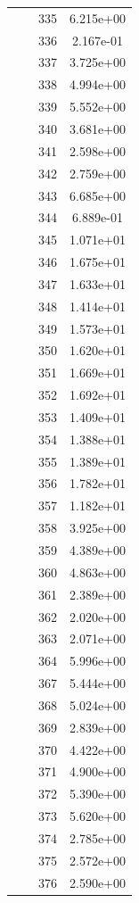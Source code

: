 \documentclass[12pt]{article}
\begin{document}
\begin{longtable}{@{}cccc@{}}
 &  & 335 & 6.215e+00 \\
 &  & 336 & 2.167e-01 \\
 &  & 337 & 3.725e+00 \\
 &  & 338 & 4.994e+00 \\
 &  & 339 & 5.552e+00 \\
 &  & 340 & 3.681e+00 \\
 &  & 341 & 2.598e+00 \\
 &  & 342 & 2.759e+00 \\
 &  & 343 & 6.685e+00 \\
 &  & 344 & 6.889e-01 \\
 &  & 345 & 1.071e+01 \\
 &  & 346 & 1.675e+01 \\
 &  & 347 & 1.633e+01 \\
 &  & 348 & 1.414e+01 \\
 &  & 349 & 1.573e+01 \\
 &  & 350 & 1.620e+01 \\
 &  & 351 & 1.669e+01 \\
 &  & 352 & 1.692e+01 \\
 &  & 353 & 1.409e+01 \\
 &  & 354 & 1.388e+01 \\
 &  & 355 & 1.389e+01 \\
 &  & 356 & 1.782e+01 \\
 &  & 357 & 1.182e+01 \\
 &  & 358 & 3.925e+00 \\
 &  & 359 & 4.389e+00 \\
 &  & 360 & 4.863e+00 \\
 &  & 361 & 2.389e+00 \\
 &  & 362 & 2.020e+00 \\
 &  & 363 & 2.071e+00 \\
 &  & 364 & 5.996e+00 \\
 &  & 367 & 5.444e+00 \\
 &  & 368 & 5.024e+00 \\
 &  & 369 & 2.839e+00 \\
 &  & 370 & 4.422e+00 \\
 &  & 371 & 4.900e+00 \\
 &  & 372 & 5.390e+00 \\
 &  & 373 & 5.620e+00 \\
 &  & 374 & 2.785e+00 \\
 &  & 375 & 2.572e+00 \\
 &  & 376 & 2.590e+00 \\

\end{longtable}
\end{document}
